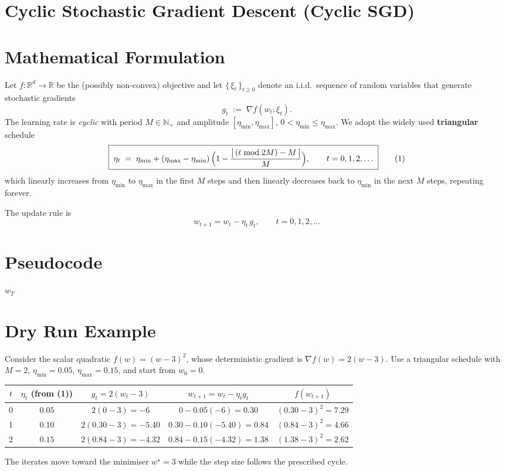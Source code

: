 \documentclass{article}
\begin{document}
\section*{Cyclic Stochastic Gradient Descent (Cyclic SGD)}

\section*{Mathematical Formulation}
Let $f:\mathbb{R}^d\rightarrow\mathbb{R}$ be the (possibly non‑convex) objective and let 
$\{\,\xi_t\,\}_{t\ge 0}$ denote an i.i.d.\ sequence of random variables that generate stochastic
gradients 
\[
g_t \;:=\; \nabla f(w_t; \xi_t).
\]
The learning rate is \emph{cyclic} with period $M\in\mathbb{N}_{+}$ and amplitude 
$[\eta_{\min},\eta_{\max}]$, $0<\eta_{\min}\le \eta_{\max}$.  
We adopt the widely used \textbf{triangular} schedule
\[
\boxed{\;
\eta_t \;=\; \eta_{\min}+(\eta_{\max}-\eta_{\min})\,
\Bigl(1-\frac{\bigl|\, (t\bmod 2M)-M\,\bigr|}{M}\Bigr),\qquad t=0,1,2,\dots
\;}
\tag{1}
\]
which linearly increases from $\eta_{\min}$ to $\eta_{\max}$ in the first $M$ steps
and then linearly decreases back to $\eta_{\min}$ in the next $M$ steps, repeating
forever.

The update rule is
\[
\boxed{\; w_{t+1}= w_t-\eta_t\, g_t,\qquad t=0,1,2,\dots \;}
\tag{2}
\]

\section*{Pseudocode}
\begin{algorithm}[H]
\caption{Cyclic SGD}
\Return $w_T$
\end{algorithm}

\section*{Dry Run Example}
Consider the scalar quadratic $f(w)=(w-3)^2$, whose deterministic gradient is
$ \nabla f(w)=2(w-3)$.  Use a triangular schedule with $M=2$, $\eta_{\min}=0.05$,
$\eta_{\max}=0.15$, and start from $w_0=0$.

\begin{center}
\begin{tabular}{c|c|c|c|c}
$t$ & $\eta_t$ (from (1)) & $g_t=2(w_t-3)$ & $w_{t+1}=w_t-\eta_t g_t$ & $f(w_{t+1})$\\\hline
0 & $0.05$ & $2(0-3)=-6$ & $0-0.05(-6)=0.30$ & $(0.30-3)^2=7.29$\\
1 & $0.10$ & $2(0.30-3)=-5.40$ & $0.30-0.10(-5.40)=0.84$ & $(0.84-3)^2=4.66$\\
2 & $0.15$ & $2(0.84-3)=-4.32$ & $0.84-0.15(-4.32)=1.38$ & $(1.38-3)^2=2.62$
\end{tabular}
\end{center}
The iterates move toward the minimiser $w^\star=3$ while the step size follows the prescribed cycle.
\end{document}
